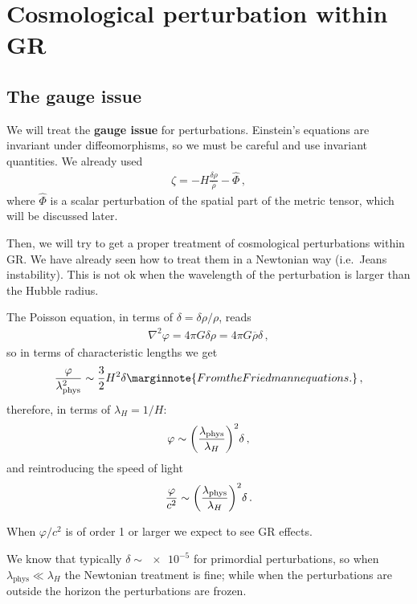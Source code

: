 \documentclass[main.tex]{subfiles}
\begin{document}
\chapter{Cosmological perturbation within GR}

\section{The gauge issue}

We will treat the \textbf{gauge issue} for perturbations. Einstein's equations are invariant under diffeomorphisms, so we must be careful and use invariant quantities. 
We already used 
%
\begin{align}
\zeta  = - H \frac{ \delta \rho}{\dot{\rho} } - \hat{\Phi}
\,,
\end{align}
%
where \(\hat{\Phi}\) is a scalar perturbation of the spatial part of the metric tensor, which will be discussed later. 

Then, we will try to get a proper treatment of cosmological perturbations within GR.
We have already seen how to treat them in a Newtonian way (i.e.\ Jeans instability). 
This is not ok when the wavelength of the perturbation is larger than the Hubble radius.

The Poisson equation, in terms of \(\delta = \delta \rho / \rho \), reads 
%
\begin{align}
\nabla^2 \varphi = 4 \pi G \delta \rho  = 4 \pi G \overline{\rho} \delta 
\,,
\end{align}
%
so in terms of characteristic lengths we get 
%
\begin{align}
\frac{\varphi}{\lambda^2 _{\text{phys}}} \sim \frac{3}{2} H^2 \delta 
\marginnote{From the Friedmann equations.}
\,,
\end{align}
%
therefore, in terms of \(\lambda _H = 1 / H\):
%
\begin{align}
\varphi \sim \qty(\frac{\lambda _{\text{phys}}}{\lambda _H})^2 \delta 
\,,
\end{align}
%
and reintroducing the speed of light 
%
\begin{align}
\frac{\varphi}{c^2} \sim \qty(\frac{\lambda _{\text{phys}}}{\lambda _H})^2 \delta 
\,.
\end{align}

When \(\varphi / c^2\) is of order 1 or larger we expect to see GR effects.

We know that typically \(\delta \sim \num{e-5}\) for primordial perturbations, so when \(\lambda _{\text{phys}} \ll \lambda _H\) the Newtonian treatment is fine; while when the perturbations are outside the horizon the perturbations are frozen. 
\end{document}
